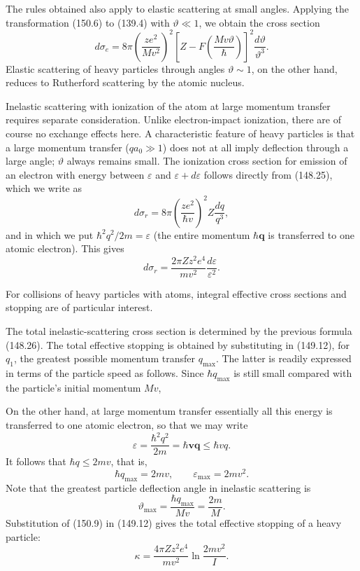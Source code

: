 The rules obtained also apply to elastic scattering at small angles. Applying
the transformation (150.6) to (139.4) with $\vartheta\ll1$, we obtain the
cross section
\begin{equation}
 d\sigma_e=8\pi\left(\frac{ze^2}{Mv^2}\right)^2
 \left[Z-F\left(\frac{Mv\vartheta}{\hbar}\right)\right]^2
 \frac{d\vartheta}{\vartheta^3}.
 \tag{150.7}
\end{equation}
Elastic scattering of heavy particles through angles $\vartheta\sim1$, on the
other hand, reduces to Rutherford scattering by the atomic nucleus.

Inelastic scattering with ionization of the atom at large momentum transfer
requires separate consideration. Unlike electron-impact ionization, there
are of course no exchange effects here. A characteristic feature of heavy
particles is that a large momentum transfer ($qa_0\gg1$) does not at all imply
deflection through a large angle; $\vartheta$ always remains small. The
ionization cross section for emission of an electron with energy between
$\varepsilon$ and $\varepsilon+d\varepsilon$ follows directly from (148.25),
which we write as
\[
 d\sigma_r=8\pi\left(\frac{ze^2}{\hbar v}\right)^2Z\frac{dq}{q^3},
\]
and in which we put $\hbar^2q^2/2m=\varepsilon$ (the entire momentum
$\hbar\mathbf q$ is transferred to one atomic electron). This gives
\begin{equation}
 d\sigma_r=\frac{2\pi Zz^2e^4}{mv^2}
 \frac{d\varepsilon}{\varepsilon^2}.
 \tag{150.8}
\end{equation}

For collisions of heavy particles with atoms, integral effective cross
sections and stopping are of particular interest.

The total inelastic-scattering cross section is determined by the previous
formula (148.26). The total effective stopping is obtained by substituting in
(149.12), for $q_1$, the greatest possible momentum transfer $q_{\max}$. The
latter is readily expressed in terms of the particle speed as follows. Since
$\hbar q_{\max}$ is still small compared with the particle's initial momentum
$Mv$,



On the other hand, at large momentum transfer essentially all this energy is
transferred to one atomic electron, so that we may write
\[
 \varepsilon=\frac{\hbar^2q^2}{2m}
 =\hbar\mathbf v\mathbf q\leqslant\hbar vq.
\]
It follows that $\hbar q\leqslant2mv$, that is,
\begin{equation}
 \hbar q_{\max}=2mv,\qquad \varepsilon_{\max}=2mv^2.
 \tag{150.9}
\end{equation}
Note that the greatest particle deflection angle in inelastic scattering is
\[
 \vartheta_{\max}=\frac{\hbar q_{\max}}{Mv}=\frac{2m}{M}.
\]
Substitution of (150.9) in (149.12) gives the total effective stopping of a
heavy particle:
\begin{equation}
 \kappa=\frac{4\pi Zz^2e^4}{mv^2}\ln\frac{2mv^2}{I}.
 \tag{150.10}
\end{equation}
